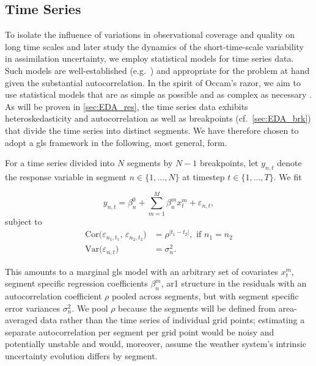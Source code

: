 \subsection{Time Series}\label{sec:EDA_tim}
To isolate the influence of variations in observational coverage and quality on long time scales and later study the dynamics of the short-time-scale variability in assimilation uncertainty, we employ statistical models for time series data. Such models are well-established (e.g.~\cite{deistlerTimeSeriesModels2022}) and appropriate for the problem at hand given the substantial autocorrelation. In the spirit of Occam's razor, we aim to use statistical models that are as simple as possible and as complex as necessary \parencite{boxRobustnessStrategyScientific1979}. As will be proven in \cref{sec:EDA_res}, the time series data exhibits heteroskedasticity and autocorrelation as well as breakpoints (cf.~\cref{sec:EDA_brk}) that divide the time series into distinct segments. We have therefore chosen to adopt a \gls{gls} framework in the following, most general, form.

For a time series divided into $N$ segments by $N-1$ breakpoints, let $y_{n,t}$ denote the response variable in segment $n \in \{1, \ldots, N\}$ at timestep $t \in \{1, \ldots , T\}$. We fit

\begin{equation}\label{eq:mod}
    y_{n,t} = \beta^0_n + \sum_{m=1}^M \beta^m_n x^m_t + \varepsilon_{n,t},
\end{equation}
subject to
\begin{align} \label{eq:HAC}
    \mathrm{Cor}\bigl(\varepsilon_{n_1, t_1},\,\varepsilon_{n_2, t_2}\bigr)
     & = \rho^{|t_1-t_2|}, \text{ if $n_1 = n_2$} \\[6pt]
    \mathrm{Var}\bigl(\varepsilon_{n,t}\bigr)
     & = \sigma_n^2.
\end{align}

This amounts to a marginal \gls{gls} model with an arbitrary set of covariates $x_t^m$, segment specific regression coefficients $\beta_n^m$, \gls{ar1} structure in the residuals with an autocorrelation coefficient $\rho$ pooled across segments, but with segment specific error variances $\sigma^2_n$. We pool $\rho$ because the segments will be defined from area-averaged data rather than the time series of individual grid points; estimating a separate autocorrelation per segment per grid point would be noisy and potentially unstable and would, moreover, assume the weather system's intrinsic uncertainty evolution differs by segment.

